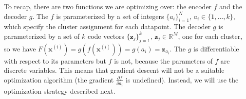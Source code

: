 \begin{center}
\end{center}

To recap, there are two functions we are optimizing over: the encoder $f$ and the decoder $g$. The $f$ is parameterized by a set of integers $\{a_i\}_{i=1}^N$,  $a_i \in \{1,\ldots,k\}$, which specify the cluster assignment for each datapoint. The decoder $g$ is parameterized by a set of $k$ code vectors $\{\mathbf{z}_j\}_{j=1}^k$, $\mathbf{z}_j \in \mathbb{R}^{M}$, one for each cluster, so we have $F(\mathbf{x}^{(i)}) = g(f(\mathbf{x}^{(i)})) = g(a_i) = \mathbf{z}_{a_i}$. The $g$ is differentiable with respect to its parameters but $f$ is not, because the parameters of $f$ are discrete variables. This means that gradient descent will not be a suitable optimization algorithm (the gradient $\frac{\partial f}{\partial a_i}$ is undefined). Instead, we will use the optimization strategy described next.

